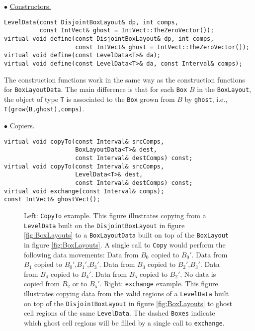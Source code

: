 \begin{trivlist}
\item $\bullet$ \underline{Constructors.}
\begin{verbatim}
LevelData(const DisjointBoxLayout& dp, int comps,
          const IntVect& ghost = IntVect::TheZeroVector());
virtual void define(const DisjointBoxLayout& dp, int comps, 
                    const IntVect& ghost = IntVect::TheZeroVector());
virtual void define(const LevelData<T>& da);
virtual void define(const LevelData<T>& da, const Interval& comps);
\end{verbatim}
The construction functions work in the same way as the 
construction functions for {\tt BoxLayoutData}. The main difference is that 
for each {\tt Box} $B$ in the {\tt BoxLayout}, the object of type {\tt T}
is associated to the {\tt Box} grown from $B$ by {\tt ghost}, i.e.,
{\tt T(grow(B,ghost),comps)}. 


\item $\bullet$ \underline{Copiers.}
\begin{verbatim}
virtual void copyTo(const Interval& srcComps, 
                    BoxLayoutData<T>& dest,
                    const Interval& destComps) const;
virtual void copyTo(const Interval& srcComps, 
                    LevelData<T>& dest,
                    const Interval& destComps) const;
virtual void exchange(const Interval& comps);
const IntVect& ghostVect();
\end{verbatim}

\begin{figure}[htp]
\centerline{
\epsfxsize=2.0in
\label{fig::bl1}                
\hspace{1.in} 
\epsfxsize=2.0in
}
\label{fig::bl2}                
\caption{Left:  {\tt{CopyTo}} example.  This figure illustrates copying from
a {\tt{LevelData}} built on the {\tt{DisjointBoxLayout}} in figure 
\ref{fig:BoxLayouts}
to a {\tt{BoxLayoutData}} built on top of the {\tt{BoxLayout}} in
figure \ref{fig:BoxLayouts}.  A single call to {\tt{Copy}} would perform the following
data movements:  Data from $B_0$ copied to $B_0'$.  Data from $B_1$
copied to $B_0'$,$B_1'$,$B_3'$.  Data from $B_3$ copied to
$B_2'$,$B_3'$.  Data from $B_4$ copied to $B_4'$.  Data from $B_5$
copied to $B_2'$.  No data is copied from $B_2$ or to $B_5'$.  Right:
{\tt{exchange}} example.  This figure illustrates copying
data from the valid regions of a {\tt{LevelData}} built on top of the
{\tt{DisjointBoxLayout}} in figure \ref{fig:BoxLayouts} to ghost cell regions of the
same {\tt{LevelData}}.  The dashed {\tt{Boxes}} indicate which ghost
cell regions will be filled by a single call to {\tt{exchange}}.}
\label{fig:BoxLayouts2}
\end{figure}


\end{trivlist}

